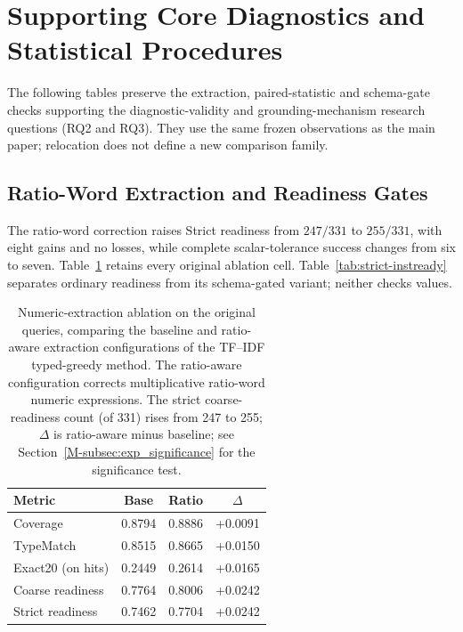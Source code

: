 \section{Supporting Core Diagnostics and Statistical Procedures}
\label{app:core-support}
The following tables preserve the extraction, paired-statistic and schema-gate checks supporting the diagnostic-validity and grounding-mechanism research questions (RQ2 and RQ3). They use the same frozen observations as the main paper; relocation does not define a new comparison family.
\subsection{Ratio-Word Extraction and Readiness Gates}
\label{app:extraction-ablation}
The ratio-word correction raises Strict readiness from $247/331$ to $255/331$, with eight gains and no losses, while complete scalar-tolerance success changes from six to seven. Table~\ref{tab:nlp4lp-prefix-postfix} retains every original ablation cell. Table~\ref{tab:strict-instready} separates ordinary readiness from its schema-gated variant; neither checks values.
\begin{table}[t]
  \centering
  \renewcommand{\arraystretch}{1.18}
  \caption{Numeric-extraction ablation on the original queries, comparing the baseline and ratio-aware extraction configurations of the TF--IDF typed-greedy method. The ratio-aware configuration corrects multiplicative ratio-word numeric expressions. The strict coarse-readiness count (of 331) rises from 247 to 255; $\Delta$ is ratio-aware minus baseline; see Section~\ref{M-subsec:exp_significance} for the significance test.}
  \label{tab:nlp4lp-prefix-postfix}
  \small
  \setlength{\tabcolsep}{4pt}
  \begin{tabular}{lccc}
    \toprule
    Metric & Base & Ratio & $\Delta$ \\
    \midrule
Coverage & 0.8794 & 0.8886 & +0.0091 \\
TypeMatch & 0.8515 & 0.8665 & +0.0150 \\
Exact20 (on hits) & 0.2449 & 0.2614 & +0.0165 \\
Coarse readiness & 0.7764 & 0.8006 & +0.0242 \\
Strict readiness & 0.7462 & 0.7704 & +0.0242 \\
    \bottomrule
  \end{tabular}
\end{table}
